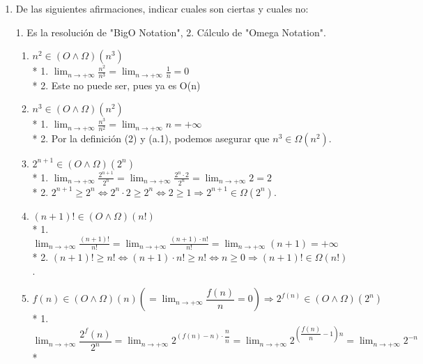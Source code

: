 \documentclass{article}
\begin{document}
	\begin{enumerate}
		\item De las siguientes afirmaciones, indicar cuales son ciertas y cuales no:
		\begin{center}
		\end{center}
		1. Es la resolución de "BigO Notation", 2. Cálculo de "Omega Notation".
		\begin{enumerate}
			\item $n^2\in (O\wedge\Omega)(n^3)$\\*
				1. $\displaystyle{\lim_{n \to +\infty}} \frac{n^2}{n^3} = \displaystyle{\lim_{n \to +\infty}} \frac{1}{n} = 0$\\*
				2. Este no puede ser, pues ya es O(n)
			\item $n^3\in (O\wedge\Omega)(n^2)$\\*
				1. $\displaystyle{\lim_{n \to +\infty}} \frac{n^3}{n^2} = \displaystyle{\lim_{n \to +\infty}} n = +\infty$\\*
				2. Por la definición (2) y (a.1), podemos asegurar que $n^3\in \Omega(n^2)$.
			\item $2^{n+1}\in (O\wedge\Omega)(2^n)$\\*
				1. $\displaystyle{\lim_{n \to +\infty}} \frac{2^{n+1}}{2^n} = \displaystyle{\lim_{n \to +\infty}} \frac{2^{n}\cdot 2}{2^n} = \displaystyle{\lim_{n \to +\infty}} 2 = 2$\\*
				2. $2^{n+1}\ge 2^n \Leftrightarrow 2^{n}\cdot 2\ge 2^n \Leftrightarrow 2 \ge 1 \Rightarrow 2^{n+1}\in \Omega(2^{n})$.
			\item $(n+1)!\in (O\wedge\Omega)(n!)$\\*
				1. $\displaystyle{\lim_{n \to +\infty}} \frac{(n+1)!}{n!} = \displaystyle{\lim_{n \to +\infty}} \frac{(n+1)\cdot  n!}{n!} = \displaystyle{\lim_{n \to +\infty}} (n+1) = +\infty$\\*
				2. $(n+1)!\ge n! \Leftrightarrow (n+1)\cdot n! \ge n!\Leftrightarrow n \ge 0 \Rightarrow (n+1)!\in \Omega(n!)$.
			\item $f(n)\in (O\wedge\Omega)(n)\left(=\displaystyle{\lim_{n \to +\infty}}\dfrac{f(n)}{n}=0\right)\Rightarrow 2^{f(n)}\in (O\wedge\Omega)(2^n)$\\*
				1. $\displaystyle{\lim_{n \to +\infty}} \dfrac{2^f(n)}{2^n}=\displaystyle{\lim_{n \to +\infty}}2^{(f(n)-n)\cdot\dfrac{n}{n}}=\displaystyle{\lim_{n \to +\infty}}2^{(\dfrac{f(n)}{n}-1)n}=\displaystyle{\lim_{n \to +\infty}}2^{-n}$ \\*

\end{enumerate}
\end{enumerate}
\end{document}
